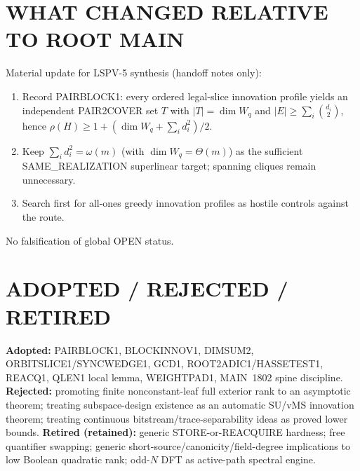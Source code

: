 \documentclass[11pt]{article}
\begin{document}
\section*{WHAT CHANGED RELATIVE TO ROOT MAIN}
Material update for LSPV-5 synthesis (handoff notes only):
\begin{enumerate}
\item Record PAIRBLOCK1: every ordered legal-slice innovation profile yields an independent PAIR2COVER set
$T$ with $|T|=\dim W_q$ and $|E|\ge\sum_i\binom{d_i}{2}$, hence
$\rho(H)\ge 1+(\dim W_q+\sum_i d_i^2)/2$.
\item Keep $\sum_i d_i^2=\omega(m)$ (with $\dim W_q=\Theta(m)$) as the sufficient SAME\_REALIZATION
superlinear target; spanning cliques remain unnecessary.
\item Search first for all-ones greedy innovation profiles as hostile controls against the route.
\end{enumerate}
No falsification of global OPEN status.

\section*{ADOPTED / REJECTED / RETIRED}
\textbf{Adopted:} PAIRBLOCK1, BLOCKINNOV1, DIMSUM2, ORBITSLICE1/SYNCWEDGE1, GCD1,
ROOT2ADIC1/HASSETEST1, REACQ1, QLEN1 local lemma, WEIGHTPAD1, MAIN~1802 spine discipline.
\textbf{Rejected:} promoting finite nonconstant-leaf full exterior rank to an asymptotic theorem;
treating subspace-design existence as an automatic SU/vMS innovation theorem; treating continuous
bitstream/trace-separability ideas as proved lower bounds.
\textbf{Retired (retained):} generic STORE-or-REACQUIRE hardness; free quantifier swapping;
generic short-source/canonicity/field-degree implications to low Boolean quadratic rank;
odd-$N$ DFT as active-path spectral engine.
\end{document}
